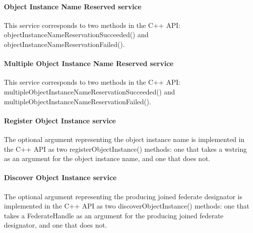 \begin{compactstdpage}
    \paragraph{Object Instance Name Reserved \rtiinitiated{} service}

    This service corresponds to two methods in the C++ API: objectInstanceNameReservationSucceeded() and objectInstanceNameReservationFailed().

    \paragraph{Multiple Object Instance Name Reserved \rtiinitiated{} service}

    This service corresponds to two methods in the C++ API: multipleObjectInstanceNameReservationSucceeded() and multipleObjectInstanceNameReservationFailed().

    \paragraph{Register Object Instance service}

    The optional argument representing the object instance name is implemented in the C++ API as two registerObjectInstance() methods: one that takes a wstring as an argument for the object instance name, and one that does not.

    \paragraph{Discover Object Instance service}

    The optional argument representing the producing joined federate designator is implemented in the C++ API as two discoverObjectInstance() methods: one that takes a FederateHandle as an argument for the producing joined federate designator, and one that does not.

\end{compactstdpage}

\clearpage

